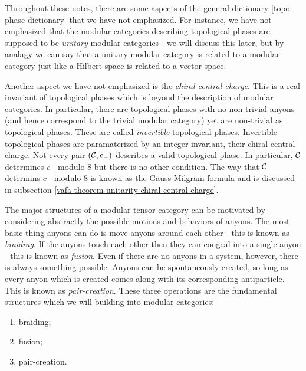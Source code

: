 \begin{rem}\label{chiral-central-charge-remark} Throughout these notes, there are some aspects of the general dictionary \ref{topo-phase-dictionary} that we have not emphasized. For instance, we have not emphasized that the modular categories describing topological phases are supposed to be {\em unitary} modular categories - we will discuss this later, but by analagy we can say that a unitary modular category is related to a modular category just like a Hilbert space is related to a vector space.

Another aspect we have not emphasized is the {\em chiral central charge}. This is a real invariant of topological phases which is beyond the description of modular categories. In particular, there are topological phases with no non-trivial anyons (and hence correspond to the trivial modular category) yet are non-trivial as topological phases. These are called {\em invertible} topological phases. Invertible topological phases are paramaterized by an integer invariant, their chiral central charge. Not every pair $({\mathcal C},c_-)$ describes a valid topological phase. In particular, ${\mathcal C}$ determines $c_-$ modulo $8$ but there is no other condition. The way that ${\mathcal C}$ determins $c_-$ modulo $8$ is known as the Gauss-Milgram formula and is discussed in subsection \ref{vafa-theorem-unitarity-chiral-central-charge}. 
\end{rem}

\begin{rem}
The major structures of a modular tensor category can be motivated by considering abstractly the possible motions and behaviors of anyons. The most basic thing anyons can do is move anyons around each other - this is known as {\em braiding}. If the anyons touch each other then they can congeal into a single  anyon - this is known as {\em fusion}. Even if there are no anyons in a system, however, there is always something possible. Anyons can be spontaneously created, so long as every anyon which is created comes along with its corresponding antiparticle. This is known as {\em pair-creation}. These three operations are the fundamental structures which we will building into modular categories:

\begin{enumerate}
\item braiding;
\item fusion;
\item pair-creation.
\end{enumerate}
\end{rem}

